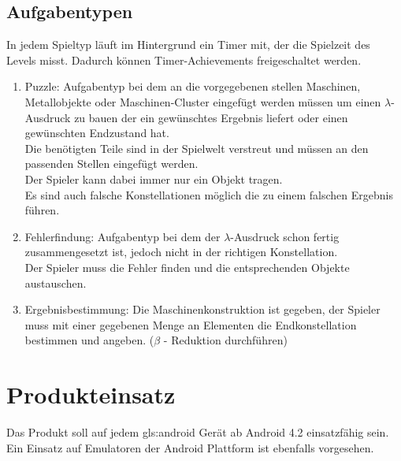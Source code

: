 \documentclass{scrartcl}
\begin{document}
\clearpage


\subsection{Aufgabentypen} \label{subsection:Aufgabentypen}

In jedem Spieltyp läuft im Hintergrund ein Timer mit, der die Spielzeit des Levels misst. Dadurch können Timer-Achievements freigeschaltet werden.
\begin{enumerate}
	\item \label{aufgabentyp:puzzle} Puzzle: Aufgabentyp bei dem an die vorgegebenen stellen Maschinen, Metallobjekte oder Maschinen-Cluster eingefügt werden müssen um einen $\lambda$-Ausdruck zu bauen der ein gewünschtes Ergebnis liefert oder einen gewünschten Endzustand hat.\\
	Die benötigten Teile sind in der Spielwelt verstreut und müssen an den passenden Stellen eingefügt werden.\\
	Der Spieler kann dabei immer nur ein Objekt tragen.\\
	Es sind auch falsche Konstellationen möglich die zu einem falschen Ergebnis führen.\\
	\item \label{aufgabentyp:fehlerfindung} Fehlerfindung: Aufgabentyp bei dem der $\lambda$-Ausdruck schon fertig zusammengesetzt ist, jedoch nicht in der richtigen Konstellation.\\
	Der Spieler muss die Fehler finden und die entsprechenden Objekte austauschen.\\
	\item \label{aufgabentyp:ergebnis} Ergebnisbestimmung: Die Maschinenkonstruktion ist gegeben, der Spieler muss mit einer gegebenen Menge an Elementen die Endkonstellation bestimmen und angeben. ($\beta$ - Reduktion durchführen) 
\end{enumerate}

\clearpage









\section{Produkteinsatz}

Das Produkt soll auf jedem \gls{gls:android} Gerät ab Android 4.2 einsatzfähig sein. Ein Einsatz auf Emulatoren der Android Plattform ist ebenfalls vorgesehen.
\end{document}
